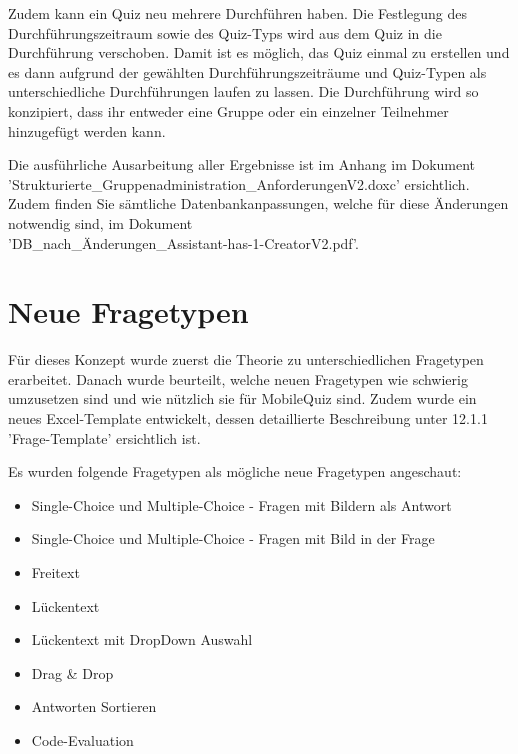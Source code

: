 Zudem kann ein Quiz neu mehrere Durchführen haben. Die Festlegung des Durchführungszeitraum sowie des Quiz-Typs wird aus dem Quiz in die Durchführung verschoben. Damit ist es möglich, das Quiz einmal zu erstellen und es dann aufgrund der gewählten Durchführungszeiträume und Quiz-Typen als unterschiedliche Durchführungen laufen zu lassen. Die Durchführung wird so konzipiert, dass ihr entweder eine Gruppe oder ein einzelner Teilnehmer hinzugefügt werden kann. 

\bigskip

Die ausführliche Ausarbeitung aller Ergebnisse ist im Anhang im Dokument 'Strukturierte\_Gruppenadministration\_AnforderungenV2.doxc' ersichtlich. Zudem finden Sie sämtliche Datenbankanpassungen, welche für diese Änderungen notwendig sind, im Dokument \\'DB\_nach\_Änderungen\_Assistant-has-1-CreatorV2.pdf'.


\section{Neue Fragetypen}
Für dieses Konzept wurde zuerst die Theorie zu unterschiedlichen Fragetypen erarbeitet. Danach wurde beurteilt, welche neuen Fragetypen wie schwierig umzusetzen sind und wie nützlich sie für MobileQuiz sind. Zudem wurde ein neues Excel-Template entwickelt, dessen detaillierte Beschreibung unter 12.1.1 'Frage-Template' ersichtlich ist.

\bigskip

\noindent Es wurden folgende Fragetypen als mögliche neue Fragetypen angeschaut:
\begin{itemize}
	\item Single-Choice und Multiple-Choice - Fragen mit Bildern als Antwort
	\item Single-Choice und Multiple-Choice - Fragen mit Bild in der Frage
	\item Freitext
	\item Lückentext
	\item Lückentext mit DropDown Auswahl
	\item Drag \& Drop
	\item Antworten Sortieren
	\item Code-Evaluation
\end{itemize}

\bigskip


